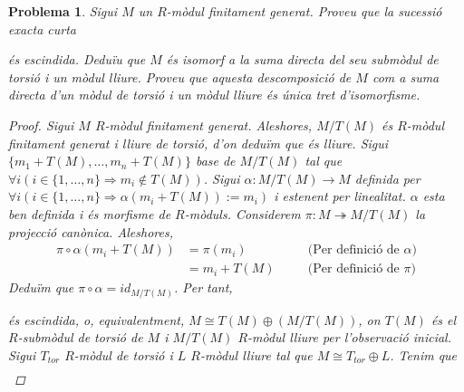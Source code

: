 \documentclass[compress]{article}
\newtheorem{problema}{Problema}
\theoremstyle{definition}
\begin{document}
\begin{problema}
    Sigui $M$ un $R$-mòdul finitament generat. Proveu que la sucessió exacta curta
    \begin{center}
    \end{center}
    és escindida. Deduïu que $M$ és isomorf a la suma directa del seu submòdul de torsió i un mòdul lliure. Proveu que aquesta descomposició de $M$ com a suma directa d'un mòdul de torsió i un mòdul lliure és única tret d'isomorfisme.
    \begin{proof}
        Sigui $M$ $R$-mòdul finitament generat. Aleshores, $M/T(M)$ és $R$-mòdul finitament generat i lliure de torsió, d'on deduïm que és lliure. Sigui $\{m_{1}+T(M),\ldots,m_{n}+T(M)\}$ base de $M/T(M)$ tal que $\forall i(i\in\{1,\ldots,n\}\Rightarrow m_{i}\notin T(M))$.\newline
        Sigui $\alpha:M/T(M)\rightarrow M$ definida per $\forall i(i\in\{1,\ldots,n\}\Rightarrow\alpha(m_{i}+T(M)):=m_{i})$ i estenent per linealitat. $\alpha$ esta ben definida i és morfisme de $R$-mòduls. Considerem $\pi:M\twoheadrightarrow M/T(M)$ la projecció canònica. Aleshores,
        \begin{align*}
            \pi\circ\alpha(m_{i}+T(M))
            &=\pi(m_{i})
            &\quad&\textrm{(Per definició de $\alpha$)}\\
            &=m_{i}+T(M)
            &\quad&\textrm{(Per definició de $\pi$)}
        \end{align*}
        Deduïm que $\pi\circ\alpha=id_{M/T(M)}$. Per tant,
        \begin{center}
        \end{center}
        és escindida, o, equivalentment, $M\cong T(M)\oplus(M/T(M))$, on $T(M)$ és el $R$-submòdul de torsió de $M$ i $M/T(M)$ $R$-mòdul lliure per l'observació inicial.\newline
        Sigui $T_{tor}$ $R$-mòdul de torsió i $L$ $R$-mòdul lliure tal que $M\cong T_{tor}\oplus L$. Tenim que
        \begin{align*}

\end{align*}
\end{proof}
\end{problema}
\end{document}
